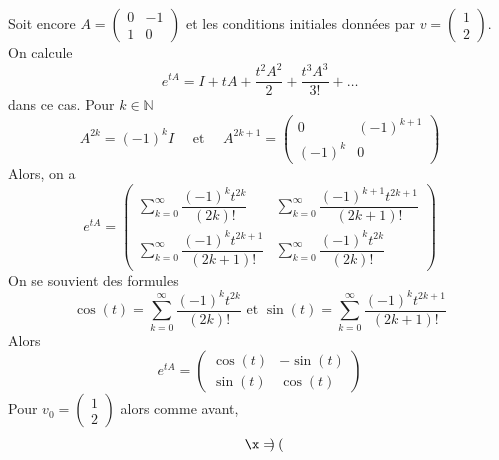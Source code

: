 \begin{example} 
  Soit encore 
  $A =
  \begin{pmatrix}
    0 & -1\\
    1 & 0
  \end{pmatrix}$ et les conditions initiales données par $v =  \left(\begin{smallmatrix}
    1\\2
  \end{smallmatrix}\right)$.
  On calcule 
  \begin{displaymath}
    e^{tA} =  I+tA+\dfrac{t^{2}A^{2}}{2}+\dfrac{t^{3}A^{3}}{3!}+\dots 
  \end{displaymath}
dans ce cas. 
Pour  $k∈ ℕ$ 
\begin{displaymath}
  A^{2k}=(-1)^{k} I  \quad \text{ et } \quad  A^{2k+1}=
\begin{pmatrix}
    0 & (-1)^{k+1}\\
    (-1)^{k} & 0
\end{pmatrix} 
\end{displaymath}
Alors, on a 
\begin{displaymath} 
  e^{tA} = 
  \begin{pmatrix} \displaystyle 
     \sum_{k=0}^{\infty}\dfrac{(-1)^{k}t^{2k}}{(2k)!} &  \displaystyle \sum_{k=0}^{\infty}\dfrac{(-1)^{k+1}t^{2k+1}}{(2k+1)!}\\
    \displaystyle \sum_{k=0}^{\infty}\dfrac{(-1)^{k}t^{2k+1}}{(2k+1)!} & \displaystyle \sum_{k=0}^{\infty}\dfrac{(-1)^{k}t^{2k}}{(2k)!}
\end{pmatrix}
\end{displaymath}
On se souvient des formules 
\begin{displaymath}
  \cos(t) =\displaystyle \sum_{k=0}^{\infty}\dfrac{(-1)^{k}t^{2k}}{(2k)!} \text{ et }\sin(t) =\displaystyle \sum_{k=0}^{\infty}\dfrac{(-1)^{k}t^{2k+1}}{(2k+1)!} 
\end{displaymath}
Alors
\begin{displaymath}
  e^{tA} = \begin{pmatrix}
    \cos(t)&-\sin(t)\\
    \sin(t)&\cos(t)
  \end{pmatrix}
\end{displaymath}
Pour  $v_0 = 
\begin{pmatrix}
    1\\
    2
\end{pmatrix} $ 
alors comme avant, 
\begin{displaymath}
  \x = \begin{pmatrix}

\end{pmatrix}
\end{displaymath}
\end{example}
